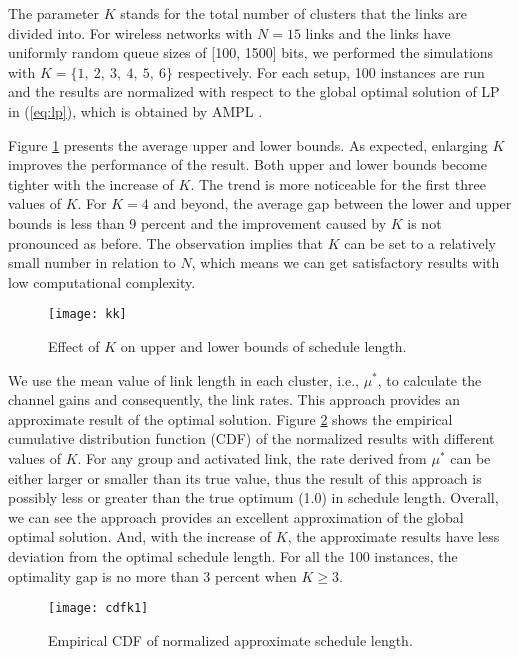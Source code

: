 \documentclass[10pt,onecolumn,journal,draftcls,oneside]{IEEEtran}
\begin{document}
The parameter $K$ stands for the total number of clusters that the links are divided into. For wireless networks with $N = 15$ links and the links have uniformly random queue sizes of [100, 1500] bits, we performed the simulations with $K= \{ 1, ~2, ~3, ~4, ~5,~6 \}$ respectively. For each setup, 100 instances are run and the results are normalized with respect to the global optimal solution of LP in (\ref{eq:lp}), which is obtained by AMPL \cite{AMPL02}. 

Figure \ref{fig:kk} presents the average upper and lower bounds. As expected, enlarging $K$ improves the performance of the result. Both upper and lower bounds become tighter with the increase of $K$. The trend is more noticeable for the first three values of $K$. For $K=4$ and beyond, the average gap between the lower and upper bounds is less than 9 percent and the improvement caused by $K$ is not pronounced as before. The observation implies that $K$ can be set to a relatively small number in relation to $N$, which means we can get satisfactory results with low computational complexity.

\begin{figure} [ht!]	
    \centering
{\texttt{[image: kk]}}
\vspace{-5mm}
\caption{Effect of $K$ on upper and lower bounds of schedule length.}
\label{fig:kk}
\end{figure}

We use the mean value of link length in each cluster, i.e., $\mu^*$, to calculate the channel gains and consequently, the link rates. This approach provides an approximate result of the optimal solution. Figure \ref{fig:cdfk} shows the empirical cumulative distribution function (CDF) of the normalized results with different values of $K$. For any group and activated link, the rate derived from $\mu^*$ can be either larger or smaller than its true value, thus the result of this approach is possibly less or greater than the true optimum (1.0) in schedule length. Overall, we can see the approach provides an excellent approximation of the global optimal solution. And, with the increase of $K$, the approximate results have less deviation from the optimal schedule length. For all the 100 instances, the optimality gap is no more than 3 percent when $K \geq 3$.

\begin{figure} [ht!]	
    \centering
{\texttt{[image: cdfk1]}}
\vspace{-5mm}
\caption{Empirical CDF of normalized approximate schedule length.}
\label{fig:cdfk}
\end{figure}
\end{document}
